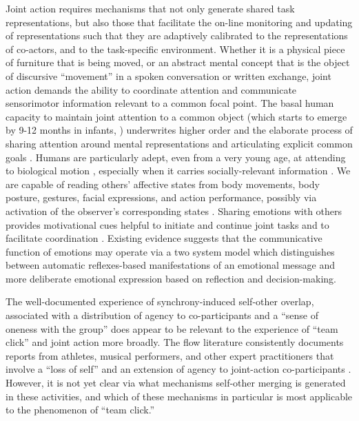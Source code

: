 \begin{CJK}{UTF8}{gbsn}
Joint action requires mechanisms that not only generate shared task representations, but also those that facilitate the on-line monitoring and updating of representations such that they are adaptively calibrated to the representations of co-actors, and to the task-specific environment.  Whether it is a physical piece of furniture that is being moved, or an abstract mental concept that is the object of discursive ``movement'' in a spoken conversation or written exchange, joint action demands the ability to coordinate attention and communicate sensorimotor information relevant to a common focal point.  The basal human capacity to maintain joint attention to a common object (which starts to emerge by 9-12 months in infants, \cite[see]{Carpenter2013}) underwrites higher order and the elaborate process of sharing attention around mental representations and articulating explicit common goals \citep{Tomasello2014}.
Humans are particularly adept, even from a very young age, at attending to biological motion \citep{Scholl2000}, especially when it carries socially-relevant information \citep{Kozlowski1977,Cutting1977,Dittrich1996}.
We are capable of reading others' affective states from body movements, body posture, gestures, facial expressions, and action performance, possibly via activation of the observer's corresponding states \citep{Bastiaansen2009,Borgomaneri2012}. Sharing emotions with others provides motivational cues helpful to initiate and continue joint tasks and to facilitate coordination \citep{Michael2016}. Existing evidence suggests that the communicative function of emotions may operate via a two system model which distinguishes between automatic reflexes-based manifestations of an emotional message and more deliberate emotional expression based on reflection and decision-making\citep{DeGelder2006}.

The well-documented experience of synchrony-induced self-other overlap, associated with a distribution of agency to co-participants and a ``sense of oneness with the group'' \citep{Swann2012} does appear to be relevant to the experience of ``team click'' and joint action more broadly.  The flow literature consistently documents reports from athletes, musical performers, and other expert practitioners that involve a ``loss of self'' and an extension of agency to joint-action co-participants \citep{Jackson1995,Jackson1999}.  However, it is not yet clear via what mechanisms self-other merging is generated in these activities, and which of these mechanisms in particular is most applicable to the phenomenon of ``team click.''


\end{CJK}
